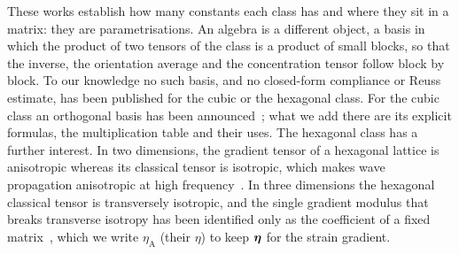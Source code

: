 These works establish how many constants each class has and where they sit in a matrix:
they are parametrisations. An algebra is a different object, a basis in which the
product of two tensors of the class is a product of small blocks, so that the inverse,
the orientation average and the concentration tensor follow block by block. To our
knowledge no such basis, and no closed-form compliance or Reuss estimate, has been
published for the cubic or the hexagonal class. For the cubic class an orthogonal basis
has been announced~\cite{Demonteaux2025}; what we add there are its explicit formulas,
the multiplication table and their uses. The hexagonal class has a further interest.
In two dimensions, the gradient tensor of a hexagonal lattice is anisotropic whereas its
classical tensor is isotropic, which makes wave propagation anisotropic at high
frequency~\cite{Rosi2016}. In three dimensions the hexagonal classical tensor is
transversely isotropic, and the single gradient modulus that breaks transverse isotropy
has been identified only as the coefficient of a fixed matrix~\cite{Auffray2013}, which
we write $\eta_{\mathrm A}$ (their $\eta$) to keep $\bm{\eta}$ for the strain gradient.

